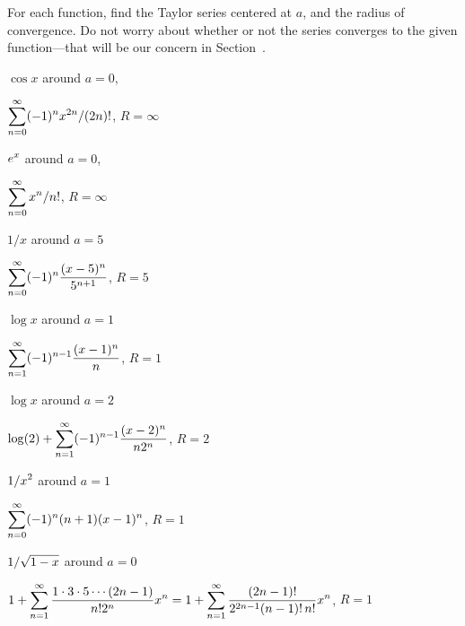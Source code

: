 \begin{exercises}

  For each function, find the Taylor series centered at $a$, and the
  radius of convergence.  Do not worry about whether or not the series
  converges to the given function---that will be our concern in 
  Section~.

\begin{exercise} $\cos x$ around $a = 0$,
\begin{answer} $\displaystyle\sum_{n=0}^\infty (-1)^n x^{2n}/(2n)!$, $R=\infty$
\end{answer}\end{exercise}

\begin{exercise} $\displaystyle e^x$ around $a = 0$,
\begin{answer} $\displaystyle\sum_{n=0}^\infty x^n/n!$, $R=\infty$
\end{answer}\end{exercise}

\begin{exercise} $1/x$ around $a=5$
\begin{answer} $\displaystyle\sum_{n=0}^\infty (-1)^n{(x-5)^n\over 5^{n+1}}$, $R=5$
\end{answer}\end{exercise}

\begin{exercise} $\log x$ around $a=1$
\begin{answer} $\displaystyle\sum_{n=1}^\infty (-1)^{n-1}{(x-1)^n\over n}$, $R=1$
\end{answer}\end{exercise}

\begin{exercise} $\log x$ around $a=2$
\begin{answer} $\displaystyle\log(2)+\sum_{n=1}^\infty (-1)^{n-1}{(x-2)^n\over n 2^n}$, $R=2$
\end{answer}\end{exercise}

\begin{exercise} $\displaystyle 1/x^2$ around $a=1$
\begin{answer} $\displaystyle\sum_{n=0}^\infty (-1)^n(n+1)(x-1)^n$, $R=1$
\end{answer}\end{exercise}

\begin{exercise} $\displaystyle 1/\sqrt{1-x}$ around $a = 0$
\begin{answer} $\displaystyle1+\sum_{n=1}^\infty {1\cdot3\cdot5\cdots(2n-1)\over
n!2^n} x^n=1+\sum_{n=1}^\infty {(2n-1)!\over 2^{2n-1}(n-1)!\,n!}x^n$, $R=1$
\end{answer}\end{exercise}


\end{exercises}
